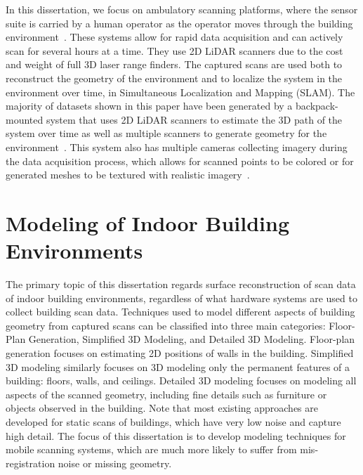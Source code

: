 \documentclass[12pt,onecolumn,oneside]{book}
\begin{document}
In this dissertation, we focus on ambulatory scanning platforms, where the sensor suite is carried by a human operator as the operator moves through the building environment~\cite{Sweep,MITBackpack,VillageHeritage}.  These systems allow for rapid data acquisition and can actively scan for several hours at a time.  They use 2D LiDAR scanners due to the cost and weight of full 3D laser range finders.  The captured scans are used both to reconstruct the geometry of the environment and to localize the system in the environment over time, in Simultaneous Localization and Mapping (SLAM).  The majority of datasets shown in this paper have been generated by a backpack-mounted system that uses 2D LiDAR scanners to estimate the 3D path of the system over time as well as multiple scanners to generate geometry for the environment~\cite{liu2010indoor,Backpack,Localization,NickJournal}.  This system also has multiple cameras collecting imagery during the data acquisition process, which allows for scanned points to be colored or for generated meshes to be textured with realistic imagery~\cite{Cheng14}. 

\section{Modeling of Indoor Building Environments}
\label{sec:building_meshing}

The primary topic of this dissertation regards surface reconstruction of scan data of indoor building environments, regardless of what hardware systems are used to collect building scan data.  Techniques used to model different aspects of building geometry from captured scans can be classified into three main categories:  Floor-Plan Generation, Simplified 3D Modeling, and Detailed 3D Modeling.  Floor-plan generation focuses on estimating 2D positions of walls in the building.  Simplified 3D modeling similarly focuses on 3D modeling only the permanent features of a building: floors, walls, and ceilings.  Detailed 3D modeling focuses on modeling all aspects of the scanned geometry, including fine details such as furniture or objects observed in the building.  Note that most existing approaches are developed for static scans of buildings, which have very low noise and capture high detail. The focus of this dissertation is to develop modeling techniques for mobile scanning systems, which are much more likely to suffer from mis-registration noise or missing geometry.
\end{document}

